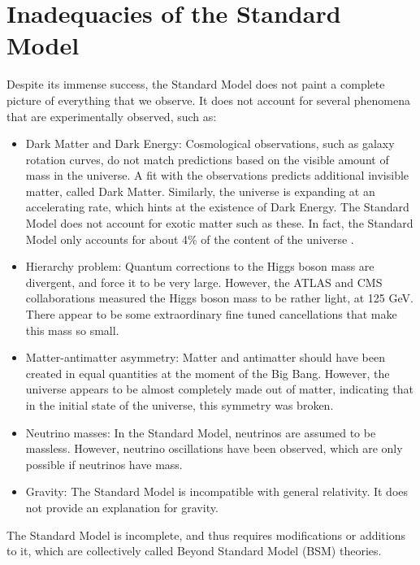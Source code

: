 \documentclass[12pt,a4paper,openright,twoside]{report}
\begin{document}
\section{Inadequacies of the Standard Model}
Despite its immense success, the Standard Model does not paint a complete picture of everything that we observe. It does not account for several phenomena that are experimentally observed, such as:
\begin{itemize}
\item Dark Matter and Dark Energy: Cosmological observations, such as galaxy rotation curves, do not match predictions based on the visible amount of mass in the universe. A fit with the observations predicts additional invisible matter, called Dark Matter\cite{DM_inc}. Similarly, the universe is expanding at an accelerating rate, which hints at the existence of Dark Energy\cite{DE}. The Standard Model does not account for exotic matter such as these. In fact, the Standard Model only accounts for about 4\% of the content of the universe \cite{Planck,DM_comp}.

\item Hierarchy problem\cite{hierarchy1,hierarchy2,hierarchy3,hierarchy4}: Quantum corrections to the Higgs boson mass are divergent, and force it to be very large. However, the ATLAS and CMS collaborations measured the Higgs boson mass to be rather light, at 125 GeV\cite{Higgs,Higgs2}. There appear to be some extraordinary fine tuned cancellations that make this mass so small.

\item Matter-antimatter asymmetry: Matter and antimatter should have been created in equal quantities at the moment of the Big Bang. However, the universe appears to be almost completely made out of matter, indicating that in the initial state of the universe, this symmetry was broken\cite{Baryon_Asymmetry}.

\item Neutrino masses: In the Standard Model, neutrinos are assumed to be massless. However, neutrino oscillations have been observed\cite{neutrino2}, which are only possible if neutrinos have mass\cite{neutrino_mass}.

\item Gravity: The Standard Model is incompatible with general relativity\cite{grav_inc}. It does not provide an explanation for gravity.

\end{itemize}

The Standard Model is incomplete, and thus requires modifications or additions to it, which are collectively called Beyond Standard Model (BSM) theories.
\end{document}
